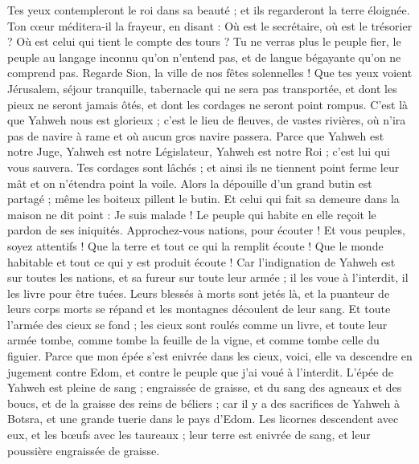 \begin{multicols}{2}
Tes yeux contempleront le roi dans sa beauté ; et ils regarderont la terre éloignée.
Ton cœur méditera-il la frayeur, en disant : Où est le secrétaire, où est le trésorier ? Où est celui qui tient le compte des tours ?
Tu ne verras plus le peuple fier, le peuple au langage inconnu qu'on n'entend pas, et de langue bégayante qu'on ne comprend pas.
Regarde Sion, la ville de nos fêtes solennelles ! Que tes yeux voient Jérusalem, séjour tranquille, tabernacle qui ne sera pas transportée, et dont les pieux ne seront jamais ôtés, et dont les cordages ne seront point rompus.
C'est là que Yahweh nous est glorieux ; c'est le lieu de fleuves, de vastes rivières, où n'ira pas de navire à rame et où aucun gros navire passera.
Parce que Yahweh est notre Juge, Yahweh est notre Législateur, Yahweh est notre Roi ; c'est lui qui vous sauvera.
Tes cordages sont lâchés ; et ainsi ils ne tiennent point ferme leur mât et on n'étendra point la voile. Alors la dépouille d'un grand butin est partagé ; même les boiteux pillent le butin.
Et celui qui fait sa demeure dans la maison ne dit point : Je suis malade ! Le peuple qui habite en elle reçoit le pardon de ses iniquités.
\VerseOne{}Approchez-vous nations, pour écouter ! Et vous peuples, soyez attentifs ! Que la terre et tout ce qui la remplit écoute ! Que le monde habitable et tout ce qui y est produit écoute !
Car l'indignation de Yahweh est sur toutes les nations, et sa fureur sur toute leur armée ; il les voue à l'interdit, il les livre pour être tuées.
Leurs blessés à morts sont jetés là, et la puanteur de leurs corps morts se répand et les montagnes découlent de leur sang.
Et toute l'armée des cieux se fond ; les cieux sont roulés comme un livre, et toute leur armée tombe, comme tombe la feuille de la vigne, et comme tombe celle du figuier.
Parce que mon épée s'est enivrée dans les cieux, voici, elle va descendre en jugement contre Edom, et contre le peuple que j'ai voué à l'interdit.
L'épée de Yahweh est pleine de sang ; engraissée de graisse, et du sang des agneaux et des boucs, et de la graisse des reins de béliers ; car il y a des sacrifices de Yahweh à Botsra, et une grande tuerie dans le pays d'Edom.
Les licornes descendent avec eux, et les bœufs avec les taureaux ; leur terre est enivrée de sang, et leur poussière engraissée de graisse.

\end{multicols}
